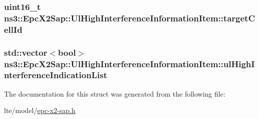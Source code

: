 \subsubsection[{\texorpdfstring{target\+Cell\+Id}{targetCellId}}]{\setlength{\rightskip}{0pt plus 5cm}uint16\+\_\+t ns3\+::\+Epc\+X2\+Sap\+::\+Ul\+High\+Interference\+Information\+Item\+::target\+Cell\+Id}\hypertarget{structns3_1_1EpcX2Sap_1_1UlHighInterferenceInformationItem_a1d714b02be3560e21f9125f778f8bce9}{}\label{structns3_1_1EpcX2Sap_1_1UlHighInterferenceInformationItem_a1d714b02be3560e21f9125f778f8bce9}
\subsubsection[{\texorpdfstring{ul\+High\+Interference\+Indication\+List}{ulHighInterferenceIndicationList}}]{\setlength{\rightskip}{0pt plus 5cm}std\+::vector$<$bool$>$ ns3\+::\+Epc\+X2\+Sap\+::\+Ul\+High\+Interference\+Information\+Item\+::ul\+High\+Interference\+Indication\+List}\hypertarget{structns3_1_1EpcX2Sap_1_1UlHighInterferenceInformationItem_ae37bd1661735b8534e29cb830c919f04}{}\label{structns3_1_1EpcX2Sap_1_1UlHighInterferenceInformationItem_ae37bd1661735b8534e29cb830c919f04}


The documentation for this struct was generated from the following file\+:\begin{DoxyCompactItemize}
\item 
lte/model/\hyperlink{epc-x2-sap_8h}{epc-\/x2-\/sap.\+h}\end{DoxyCompactItemize}
